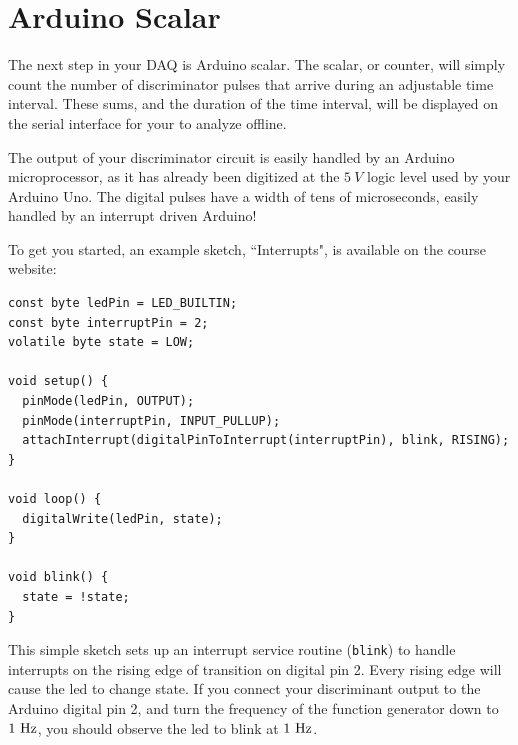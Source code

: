 \documentclass[12pt]{article}
\begin{document}
\section{Arduino Scalar}

The next step in your DAQ is Arduino scalar.  The scalar, or counter, will simply count the number of discriminator pulses that arrive during an adjustable time interval.  These sums, and the duration of the time interval, will be displayed on the serial interface for your to analyze offline.

The output of your discriminator circuit is easily handled by an Arduino microprocessor, as it has already been digitized at the $5~V$ logic level used by your Arduino Uno.  The digital pulses have a width of tens of microseconds, easily handled by an interrupt driven Arduino!

To get you started, an example sketch, ``Interrupts", is available on the course website:

\begin{verbatim}
const byte ledPin = LED_BUILTIN;
const byte interruptPin = 2;
volatile byte state = LOW;

void setup() {
  pinMode(ledPin, OUTPUT);
  pinMode(interruptPin, INPUT_PULLUP);
  attachInterrupt(digitalPinToInterrupt(interruptPin), blink, RISING);
}

void loop() {
  digitalWrite(ledPin, state);
}

void blink() {
  state = !state;
}
\end{verbatim}

This simple sketch sets up an interrupt service routine ({\tt blink}) to handle interrupts on the rising edge of transition on digital pin 2.  Every rising edge will cause the led to change state.  If you connect your discriminant output to the Arduino digital pin 2, and turn the frequency of the function generator down to $1~\rm Hz$, you should observe the led to blink at $1~\rm Hz$.
\end{document}
